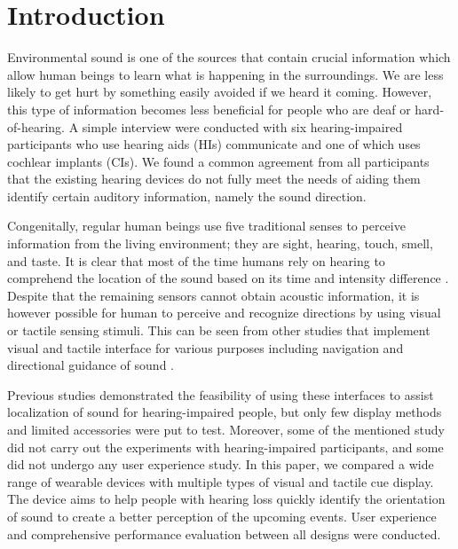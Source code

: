 \documentclass{sigchi}
\begin{document}


\section{Introduction}
Environmental sound is one of the sources that contain crucial information which allow human beings to learn what is happening in the surroundings. We are less likely to get hurt by something easily avoided if we heard it coming. However, this type of information becomes less beneficial for people who are deaf or hard-of-hearing. A simple interview were conducted with six hearing-impaired participants who use hearing aids (HIs) communicate and one of which uses cochlear implants (CIs). We found a common agreement from all participants that the existing hearing devices do not fully meet the needs of aiding them identify certain auditory information, namely the sound direction.

Congenitally, regular human beings use five traditional senses to perceive information from the living environment; they are sight, hearing, touch, smell, and taste. It is clear that most of the time humans rely on hearing to comprehend the location of the sound based on its time and intensity difference \cite{Wallach1939}. Despite that the remaining sensors cannot obtain acoustic information, it is however possible for human to perceive and recognize directions by using visual or tactile sensing stimuli. This can be seen from other studies that implement visual and tactile interface for various purposes including navigation and directional guidance of sound \cite{Borg,Kim2013,Tessendorf2011,Tsukada2004}.

Previous studies demonstrated the feasibility of using these interfaces to assist localization of sound for hearing-impaired people, but only few display methods and limited accessories were put to test. Moreover, some of the mentioned study did not carry out the experiments with hearing-impaired participants, and some did not undergo any user experience study. In this paper, we compared a wide range of wearable devices with multiple types of visual and tactile cue display. The device aims to help people with hearing loss quickly identify the orientation of sound to create a better perception of the upcoming events. User experience and comprehensive performance evaluation between all designs were conducted.
\end{document}
